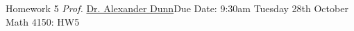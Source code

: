 



\newpage{}
{Homework 5}
{\textit{Prof.} \href{https://alexjdunn.weebly.com/}{Dr. Alexander Dunn}}{Due Date: 9:30am Tuesday 28th October}
{Math 4150: HW5}


\newpage










